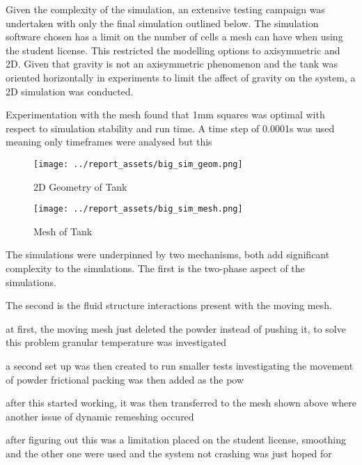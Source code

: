 Given the complexity of the simulation, an extensive testing campaign was undertaken with only the final simulation outlined below. The simulation software chosen has a limit on the number of cells a mesh can have when using the student license. This restricted the modelling options to axisymmetric and 2D. Given that gravity is not an axisymmetric phenomenon and the tank was oriented horizontally in experiments to limit the affect of gravity on the system, a 2D simulation was conducted. 

Experimentation with the mesh found that 1mm squares was optimal with respect to simulation stability and run time. A time step of 0.0001s was used meaning only timeframes were analysed but this 
\begin{figure}[htbp]
    \centering

    \begin{minipage}{0.45\textwidth}
        \centering
        \texttt{[image: ../report\_assets/big\_sim\_geom.png]}
        \caption{2D Geometry of Tank}\label{fig:2D-tank}
    \end{minipage}
    \hfill
    \begin{minipage}{0.45\textwidth}
        \centering
        \texttt{[image: ../report\_assets/big\_sim\_mesh.png]}
        \caption{Mesh of Tank}\label{fig:mesh-tank}
    \end{minipage}

\end{figure}
The simulations were underpinned by two mechanisms, both add significant complexity to the simulations. The first is the two-phase aspect of the simulations. 

The second is the fluid structure interactions present with the moving mesh.


at first, the moving mesh just deleted the powder instead of pushing it, to solve this problem
granular temperature was investigated

a second set up was then created to run smaller tests investigating the movement of powder
frictional packing was then added as the pow

after this started working, it was then transferred to the mesh shown above where another issue of dynamic remeshing occured

after figuring out this was a limitation placed on the student license, smoothing and the other one were used and the system not crashing was just hoped for

